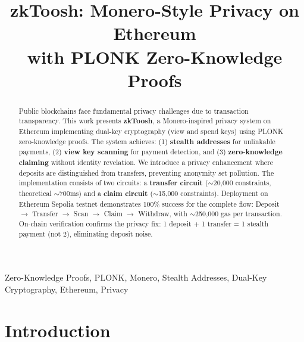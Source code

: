 \documentclass[conference]{IEEEtran}
\begin{document}
% 
% 
\title{zkToosh: Monero-Style Privacy on Ethereum \\with PLONK Zero-Knowledge Proofs}

% 
% 
\author{
}

\maketitle

% 
% 
\begin{abstract}
Public blockchains face fundamental privacy challenges due to transaction transparency. This work presents \textbf{zkToosh}, a Monero-inspired privacy system on Ethereum implementing dual-key cryptography (view and spend keys) using PLONK zero-knowledge proofs. The system achieves: (1) \textbf{stealth addresses} for unlinkable payments, (2) \textbf{view key scanning} for payment detection, and (3) \textbf{zero-knowledge claiming} without identity revelation. We introduce a privacy enhancement where deposits are distinguished from transfers, preventing anonymity set pollution. The implementation consists of two circuits: a \textbf{transfer circuit} ($\sim$20,000 constraints, theoretical $\sim$700ms) and a \textbf{claim circuit} ($\sim$15,000 constraints). Deployment on Ethereum Sepolia testnet demonstrates 100\% success for the complete flow: Deposit $\rightarrow$ Transfer $\rightarrow$ Scan $\rightarrow$ Claim $\rightarrow$ Withdraw, with $\sim$250,000 gas per transaction. On-chain verification confirms the privacy fix: 1 deposit + 1 transfer = 1 stealth payment (not 2), eliminating deposit noise.
\end{abstract}

% 
% 
\begin{IEEEkeywords}
Zero-Knowledge Proofs, PLONK, Monero, Stealth Addresses, Dual-Key Cryptography, Ethereum, Privacy
\end{IEEEkeywords}

% 
% 
\section{Introduction}
\end{document}
